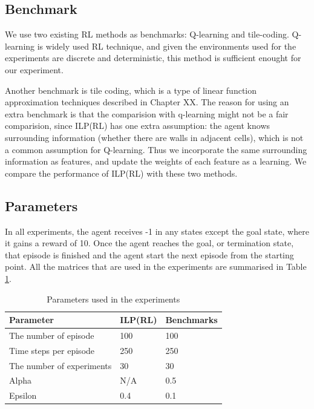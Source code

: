 \subsection{Benchmark}
We use two existing RL methods as benchmarks: Q-learning and tile-coding. 
Q-learning is widely used RL technique, and given the environments used for the experiments are discrete and deterministic, this method is sufficient enought for our experiment.

Another benchmark is tile coding, which is a type of linear function approximation techniques described in Chapter XX.
The reason for using an extra benchmark is that the comparision with q-learning might not be a fair comparision,
since ILP(RL) has one extra assumption: the agent knows surrounding information (whether there are walls in adjacent cells),
which is not a common assumption for Q-learning. Thus we incorporate the same surrounding information as features, and update the weights of each feature as a learning.
We compare the performance of ILP(RL) with these two methods.

\subsection{Parameters}
In all experiments, the agent receives -1 in any states except the goal state, where it gains a reward of 10.
Once the agent reaches the goal, or termination state, that episode is finished and the agent start the next episode from the starting point.
All the matrices that are used in the experiments are summarised in Table \ref{param}. 

\begin{table}[!ht!b]
\centering
\begin{tabular}{lll}
\hline
Parameter            & ILP(RL)    & Benchmarks      \\ \hline
The number of episode& 100        & 100        \\
Time steps per episode& 250        & 250        \\
The number of experiments& 30       & 30       \\
Alpha                & N/A       & 0.5       \\
Epsilon              & 0.4        & 0.1        \\
\end{tabular}
\caption{Parameters used in the experiments}
\label{param}
\end{table}

